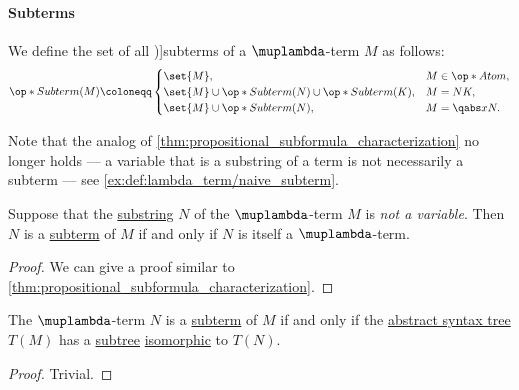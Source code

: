 \paragraph{Subterms}

\begin{definition}\label{def:lambda_subterm}
  We define the set of all \term[ru=подтерм (\cite[269]{Герасимов2014Вычислимость})]{subterms} of a \( \muplambda \)-term \( M \) as follows:
  \begin{equation*}
    \op*{Subterm}(M) \coloneqq \begin{cases}
      \set{ M },                                             &M \in \op*{Atom}, \\
      \set{ M } \cup \op*{Subterm}(N) \cup \op*{Subterm}(K), &M = N K, \\
      \set{ M } \cup \op*{Subterm}(N),                       &M = \qabs x N.
    \end{cases}
  \end{equation*}
\end{definition}
\begin{comments}
  \item Note that the analog of \cref{thm:propositional_subformula_characterization} no longer holds --- a variable that is a substring of a term is not necessarily a subterm --- see \cref{ex:def:lambda_term/naive_subterm}.
\end{comments}

\begin{proposition}\label{thm:lambda_subterm_characterization}
  Suppose that the \hyperref[def:formal_language/substring]{substring} \( N \) of the \( \muplambda \)-term \( M \) is \emph{not a variable}. Then \( N \) is a \hyperref[def:lambda_subterm]{subterm} of \( M \) if and only if \( N \) is itself a \( \muplambda \)-term.
\end{proposition}
\begin{proof}
  We can give a proof similar to \cref{thm:propositional_subformula_characterization}.
\end{proof}

\begin{proposition}\label{thm:lambda_term_ast_subterm}
  The \( \muplambda \)-term \( N \) is a \hyperref[def:lambda_subterm]{subterm} of \( M \) if and only if the \hyperref[def:lambda_term_ast]{abstract syntax tree} \( T(M) \) has a \hyperref[def:tree/subobject]{subtree} \hyperref[def:labeled_tree/morphism]{isomorphic} to \( T(N) \).
\end{proposition}
\begin{proof}
  Trivial.
\end{proof}

